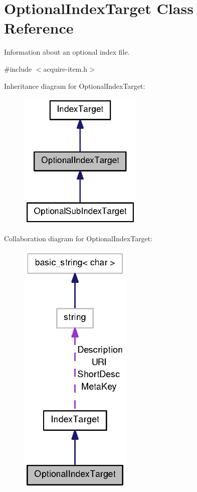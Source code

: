 \section{\-Optional\-Index\-Target \-Class \-Reference}
\label{classOptionalIndexTarget}


\-Information about an optional index file.  




{\ttfamily \#include $<$acquire-\/item.\-h$>$}



\-Inheritance diagram for \-Optional\-Index\-Target\-:
\nopagebreak
\begin{figure}[H]
\begin{center}
\leavevmode
\includegraphics[width=168pt]{classOptionalIndexTarget__inherit__graph}
\end{center}
\end{figure}


\-Collaboration diagram for \-Optional\-Index\-Target\-:
\nopagebreak
\begin{figure}[H]
\begin{center}
\leavevmode
\includegraphics[width=152pt]{classOptionalIndexTarget__coll__graph}
\end{center}
\end{figure}



